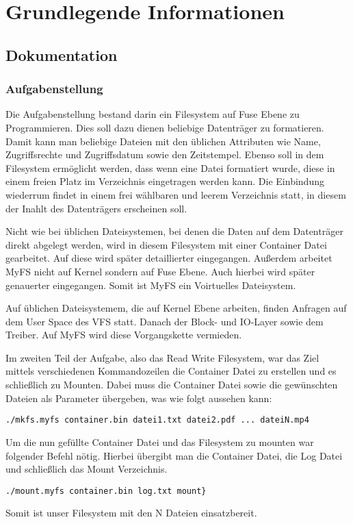 \part{Grundlegende Informationen }
\chapter{Dokumentation}
\section{Aufgabenstellung}
Die Aufgabenstellung bestand darin ein Filesystem auf Fuse Ebene zu Programmieren. Dies soll dazu dienen beliebige Datenträger zu formatieren. Damit kann man beliebige Dateien mit den üblichen Attributen wie Name, Zugriffsrechte und Zugriffsdatum sowie den Zeitstempel. Ebenso soll in dem Filesystem ermöglicht werden, dass wenn eine Datei formatiert wurde, diese in einem freien Platz im Verzeichnis eingetragen werden kann. Die Einbindung wiederrum findet in einem frei wählbaren und leerem Verzeichnis statt, in diesem der Inahlt des Datenträgers erscheinen soll. 

Nicht wie bei üblichen Dateisystemen, bei denen die Daten auf dem Datenträger direkt abgelegt werden, wird in diesem Filesystem mit einer Container Datei gearbeitet. Auf diese wird später detaillierter eingegangen. Außerdem arbeitet MyFS nicht auf Kernel sondern auf Fuse Ebene. Auch hierbei wird später genauerter eingegangen. Somit ist MyFS ein Voirtuelles Dateisystem.

Auf üblichen Dateisystemem, die auf Kernel Ebene arbeiten, finden Anfragen auf dem User Space des VFS statt. Danach der Block- und IO-Layer sowie dem Treiber. Auf MyFS wird diese Vorgangskette vermieden. 

Im zweiten Teil der Aufgabe, also das Read Write Filesystem, war das Ziel mittels verschiedenen Kommandozeilen die Container Datei zu erstellen und es schließlich zu Mounten. Dabei muss die Container Datei sowie die gewünschten Dateien als Parameter übergeben, was wie folgt aussehen kann:
\begin{lstlisting}
./mkfs.myfs container.bin datei1.txt datei2.pdf ... dateiN.mp4
\end{lstlisting}
Um die nun gefüllte Container Datei und das Filesystem zu mounten war folgender Befehl nötig. Hierbei übergibt man die Container Datei, die Log Datei und schließlich das Mount Verzeichnis. 
\begin{lstlisting}
./mount.myfs container.bin log.txt mount}
\end{lstlisting}
Somit ist unser Filesystem mit den N Dateien einsatzbereit. 

